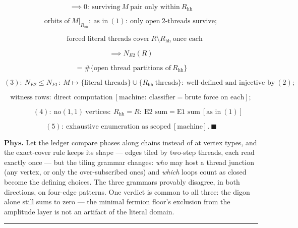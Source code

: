 \begin{theorem}
\[
\implies 0:\ \text{surviving}\ M\ \text{pair only within}\ R_{\mathrm{hh}}
\]

\[
\text{orbits of}\ M|_{R_{\mathrm{hh}}}:\ \text{as in}\ (1):\ \text{only open}\ 2\text{-threads survive};
\]

\[
\quad\text{forced literal threads cover}\ R\setminus R_{\mathrm{hh}}\ \text{once each}
\]

\[
\implies N_{E2}(R)
\]

\[
= \#\{\text{open thread partitions of}\ R_{\mathrm{hh}}\}
\]

\[
(3):\ N_{E2}\le N_{E1}:\ M\mapsto\{\text{literal threads}\}\cup\{R_{\mathrm{hh}}\ \text{threads}\}:\ \text{well-defined and injective by}\ (2);
\]

\[
\text{witness rows}:\ \text{direct computation}\ [\text{machine}:\ \text{classifier}=\text{brute force on each}];
\]

\[
\qquad (4):\ \text{no}(1,1)\ \text{vertices}:\ R_{\mathrm{hh}}=R:\ \text{E2 sum}=\text{E1 sum}\ [\text{as in}\ (1)]
\]

\[
(5):\ \text{exhaustive enumeration as scoped}\ [\text{machine}].\ \blacksquare
\]

\textbf{Phys.} Let the ledger compare phases along chains instead of at vertex types, and the exact-cover rule keeps its shape — edges tiled by two-step threads, each read exactly once — but the tiling grammar changes: \textit{who} may host a thread junction (any vertex, or only the over-subscribed ones) and \textit{which} loops count as closed become the defining choices. The three grammars provably disagree, in both directions, on four-edge patterns. One verdict is common to all three: the digon alone still sums to zero — the minimal fermion floor's exclusion from the amplitude layer is not an artifact of the literal domain.

\vspace{2pt}\noindent\rule{\textwidth}{0.4pt}\vspace{2pt}

\end{theorem}


